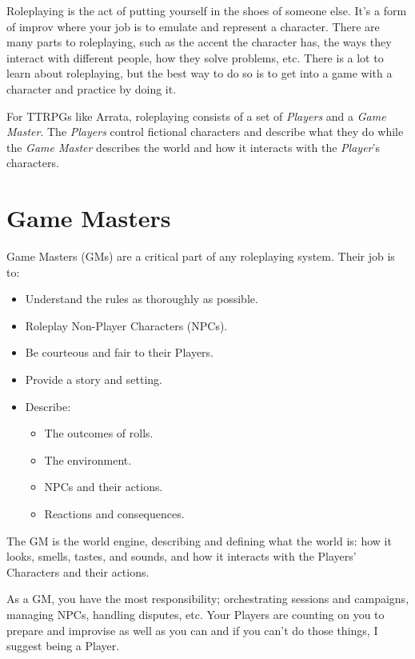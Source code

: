 \documentclass[../main.tex]{subfiles}
\begin{document}
    Roleplaying is the act of putting yourself in the shoes of someone else. It's a form of improv where your job is to emulate and represent a character. There are many parts to roleplaying, such as the accent the character has, the ways they interact with different people, how they solve problems, etc. There is a lot to learn about roleplaying, but the best way to do so is to get into a game with a character and practice by doing it.

    For TTRPGs like Arrata, roleplaying consists of a set of {\em Players} and a {\em Game Master}. The {\em Players} control fictional characters and describe what they do while the {\em Game Master} describes the world and how it interacts with the {\em Player}'s characters.

    \section{Game Masters}

    Game Masters (GMs) are a critical part of any roleplaying system. Their job is to:

    \begin{itemize}
        \item Understand the rules as thoroughly as possible.
        \item Roleplay Non-Player Characters (NPCs).
        \item Be courteous and fair to their Players.
        \item Provide a story and setting.
        \item Describe:
        \begin{itemize}
            \item The outcomes of rolls.
            \item The environment.
            \item NPCs and their actions.
            \item Reactions and consequences.
        \end{itemize}
    \end{itemize}
    
    The GM is the world engine, describing and defining what the world is: how it looks, smells, tastes, and sounds, and how it interacts with the Players' Characters and their actions.
    
    As a GM, you have the most responsibility; orchestrating sessions and campaigns, managing NPCs, handling disputes, etc. Your Players are counting on you to prepare and improvise as well as you can and if you can't do those things, I suggest being a Player.
    
\end{document}
